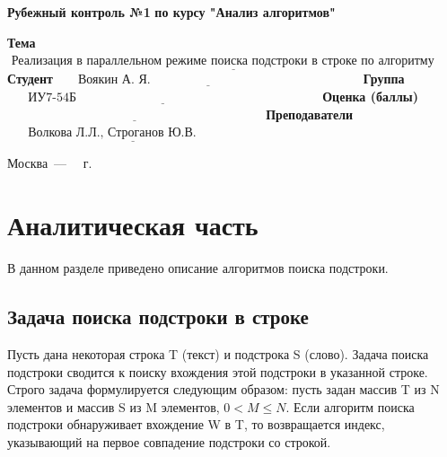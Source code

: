 \documentclass[a4paper, 14pt]{report}
\begin{document}
\begin{titlepage}
	
	\begin{center}
		\Large\textbf{Рубежный контроль №1}\newline
		\Large\textbf{по курсу "Анализ алгоритмов"}\newline
	\end{center}
	
	\noindent\textbf{Тема} $\underline{\text{~Реализация в параллельном режиме поиска подстроки в строке по алгоритму КМП}}$\newline\newline\newline
	\noindent\textbf{Студент} $\underline{\text{~~~~~Воякин А. Я.~~~~~~~~~~~~~~~~~~~~~~~~~~~~~~~~~~~~~~~~~~~~~~~~~~}}$\newline\newline
	\noindent\textbf{Группа} $\underline{\text{~~~~~ИУ7-54Б~~~~~~~~~~~~~~~~~~~~~~~~~~~~~~~~~~~~~~~~~~~~~~~~~~~~~~~~~~}}$\newline\newline
	\noindent\textbf{Оценка (баллы)} $\underline{\text{~~~~~~~~~~~~~~~~~~~~~~~~~~~~~~~~~~~~~~~~~~~~~~~~~~~~~~~~~~~~~}}$\newline\newline
	\noindent\textbf{Преподаватели} $\underline{\text{~~~~~Волкова Л.Л., Строганов Ю.В.~~~~~~~~~~~~~~~}}$\newline
	
	\begin{center}
		\vfill
		Москва~---~\the\year
		~г.
	\end{center}

\end{titlepage}
	
	\setcounter{page}{2}
	\tableofcontents
	


\newpage
\chapter{Аналитическая часть}
В данном разделе приведено описание алгоритмов поиска подстроки.

\section {Задача поиска подстроки в строке} 

Пусть дана некоторая строка T (текст) и подстрока S (слово). Задача поиска подстроки сводится к поиску вхождения этой подстроки в указанной строке. Строго задача формулируется следующим образом: пусть задан массив T из N элементов и массив S из M элементов, $0<M\leq N$. Если алгоритм поиска подстроки обнаруживает вхождение W в T, то возвращается индекс, указывающий на первое совпадение подстроки со строкой.
\end{document}
